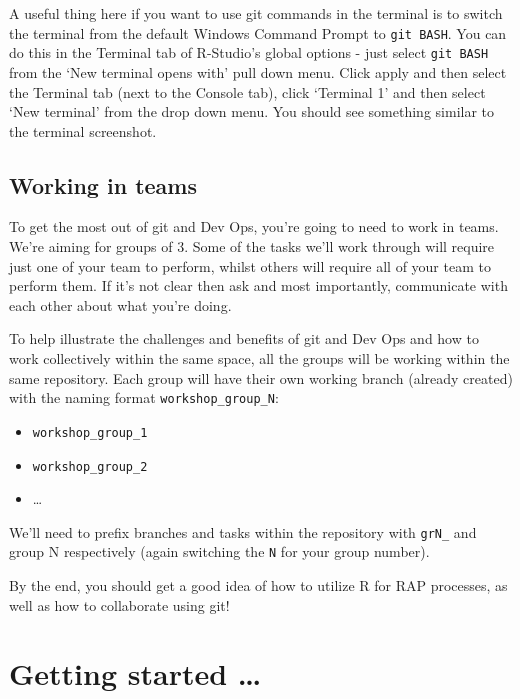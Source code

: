 \documentclass[
  12pt,
]{article}
\providecommand{\tightlist}{%
  \setlength{\itemsep}{0pt}\setlength{\parskip}{0pt}}
\begin{document}
A useful thing here if you want to use git commands in the terminal is
to switch the terminal from the default Windows Command Prompt to
\texttt{git\ BASH}. You can do this in the Terminal tab of R-Studio's
global options - just select \texttt{git\ BASH} from the `New terminal
opens with' pull down menu. Click apply and then select the Terminal tab
(next to the Console tab), click `Terminal 1' and then select `New
terminal' from the drop down menu. You should see something similar to
the terminal screenshot.

\hypertarget{working-in-teams}{%
\subsection{Working in teams}\label{working-in-teams}}

To get the most out of git and Dev Ops, you're going to need to work in
teams. We're aiming for groups of 3. Some of the tasks we'll work
through will require just one of your team to perform, whilst others
will require all of your team to perform them. If it's not clear then
ask and most importantly, communicate with each other about what you're
doing.

To help illustrate the challenges and benefits of git and Dev Ops and
how to work collectively within the same space, all the groups will be
working within the same repository. Each group will have their own
working branch (already created) with the naming format
\texttt{workshop\_group\_N}:

\begin{itemize}
\tightlist
\item
  \texttt{workshop\_group\_1}
\item
  \texttt{workshop\_group\_2}
\item
  \ldots{}
\end{itemize}

We'll need to prefix branches and tasks within the repository with
\texttt{grN\_} and group N respectively (again switching the \texttt{N}
for your group number).

By the end, you should get a good idea of how to utilize R for RAP
processes, as well as how to collaborate using git!

\newpage

\hypertarget{getting-started}{%
\section{Getting started \ldots{}}\label{getting-started}}
\end{document}
